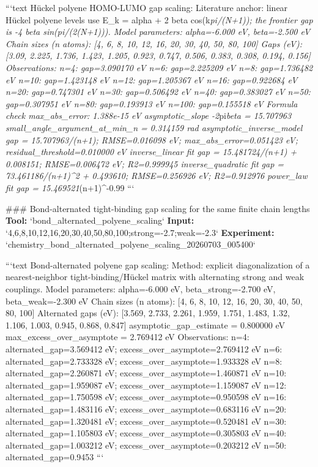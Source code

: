 \documentclass[11pt,a4paper]{article}
\begin{document}
```text
Hückel polyene HOMO-LUMO gap scaling:
  Literature anchor: linear Hückel polyene levels use E\_k = alpha + 2 beta cos(k\textit{pi/(N+1)); the frontier gap is -4 beta sin(pi/(2(N+1))).
  Model parameters: alpha=-6.000 eV, beta=-2.500 eV
  Chain sizes (n atoms): [4, 6, 8, 10, 12, 16, 20, 30, 40, 50, 80, 100]
  Gaps (eV): [3.09, 2.225, 1.736, 1.423, 1.205, 0.923, 0.747, 0.506, 0.383, 0.308, 0.194, 0.156]
  Observations:
    n=4: gap=3.090170 eV
    n=6: gap=2.225209 eV
    n=8: gap=1.736482 eV
    n=10: gap=1.423148 eV
    n=12: gap=1.205367 eV
    n=16: gap=0.922684 eV
    n=20: gap=0.747301 eV
    n=30: gap=0.506492 eV
    n=40: gap=0.383027 eV
    n=50: gap=0.307951 eV
    n=80: gap=0.193913 eV
    n=100: gap=0.155518 eV
  Formula check max\_abs\_error: 1.388e-15 eV
  asymptotic\_slope -2}pi\textit{beta = 15.707963
  small\_angle\_argument\_at\_min\_n = 0.314159 rad
  asymptotic\_inverse\_model gap = 15.707963/(n+1); RMSE=0.016098 eV; max\_abs\_error=0.051423 eV; residual\_threshold=0.010000 eV
  inverse\_linear fit gap = 15.481724/(n+1) + 0.008151; RMSE=0.006472 eV; R2=0.999945
  inverse\_quadratic fit gap = 73.461186/(n+1)\textasciicircum{}2 + 0.493610; RMSE=0.256926 eV; R2=0.912976
  power\_law fit gap = 15.469521}(n+1)\textasciicircum{}-0.99
```

\#\#\# Bond-alternated tight-binding gap scaling for the same finite chain lengths
\textbf{Tool:} `bond\_alternated\_polyene\_scaling`
\textbf{Input:} `4,6,8,10,12,16,20,30,40,50,80,100;strong=-2.7;weak=-2.3`
\textbf{Experiment:} `chemistry\_bond\_alternated\_polyene\_scaling\_20260703\_005400`

```text
Bond-alternated polyene gap scaling:
  Method: explicit diagonalization of a nearest-neighbor tight-binding/Hückel matrix with alternating strong and weak couplings.
  Model parameters: alpha=-6.000 eV, beta\_strong=-2.700 eV, beta\_weak=-2.300 eV
  Chain sizes (n atoms): [4, 6, 8, 10, 12, 16, 20, 30, 40, 50, 80, 100]
  Alternated gaps (eV): [3.569, 2.733, 2.261, 1.959, 1.751, 1.483, 1.32, 1.106, 1.003, 0.945, 0.868, 0.847]
  asymptotic\_gap\_estimate = 0.800000 eV
  max\_excess\_over\_asymptote = 2.769412 eV
  Observations:
    n=4: alternated\_gap=3.569412 eV; excess\_over\_asymptote=2.769412 eV
    n=6: alternated\_gap=2.733328 eV; excess\_over\_asymptote=1.933328 eV
    n=8: alternated\_gap=2.260871 eV; excess\_over\_asymptote=1.460871 eV
    n=10: alternated\_gap=1.959087 eV; excess\_over\_asymptote=1.159087 eV
    n=12: alternated\_gap=1.750598 eV; excess\_over\_asymptote=0.950598 eV
    n=16: alternated\_gap=1.483116 eV; excess\_over\_asymptote=0.683116 eV
    n=20: alternated\_gap=1.320481 eV; excess\_over\_asymptote=0.520481 eV
    n=30: alternated\_gap=1.105803 eV; excess\_over\_asymptote=0.305803 eV
    n=40: alternated\_gap=1.003212 eV; excess\_over\_asymptote=0.203212 eV
    n=50: alternated\_gap=0.9453
```
\end{document}
